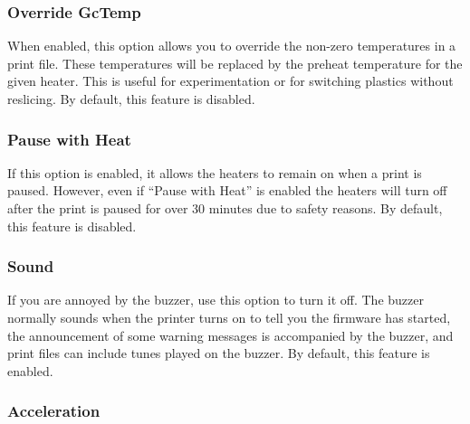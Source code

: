 \subsubsection{Override GcTemp} \label{sec:override}

When enabled, this option allows you to override the non-zero temperatures in a print file.  These temperatures will be replaced by the preheat temperature for the given heater.  This is useful for experimentation or for switching plastics without reslicing.  By default, this feature is disabled.


\subsubsection{Pause with Heat} \label{sec:pauseheat}

If this option is enabled, it allows the heaters to remain on when a print is paused.  However, even if ``Pause with Heat'' is enabled the heaters will turn off after the print is paused for over 30 minutes due to safety reasons.  By default, this feature is disabled.


\subsubsection{Sound} \label{sec:sound}

If you are annoyed by the buzzer, use this option to turn it off.  The buzzer normally sounds when the printer turns on to tell you the firmware has started, the announcement of some warning messages is accompanied by the buzzer, and print files can include tunes played on the buzzer.  By default, this feature is enabled.


\subsubsection{Acceleration} \label{sec:acceleration-enable}

